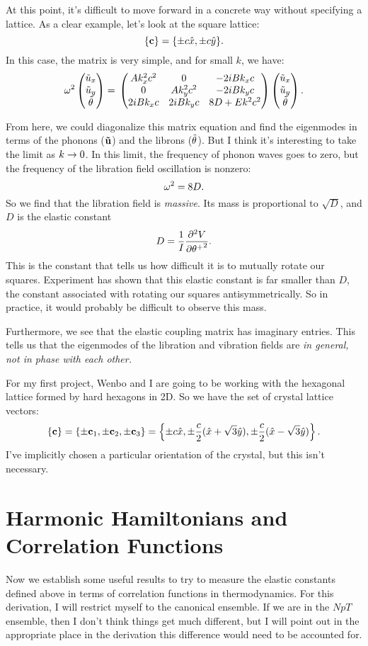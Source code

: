 \documentclass[12pt]{article}
\begin{document}
At this point, it's difficult to move forward in a concrete way without specifying a lattice. As a clear example, let's look at the square lattice:
\[ \{ \mathbf{c} \} = \{ \pm c \hat x, \pm c \hat y \}.\]
In this case, the matrix is very simple, and for small $k$, we have:
\[  \omega^2 \left(\begin{matrix} \tilde u_x \\ \tilde u_y \\ \tilde {\theta}\end{matrix}\right) = \\ \left(\begin{matrix} Ak_x^2c^2 & 0 & - 2i B k_x c \\ 0 & Ak_y^2 c^2 & -2iBk_y c \\ 2i B k_x c & 2i B k_y c & 8D + Ek^2c^2\end{matrix}\right) \left(\begin{matrix} \tilde u_x \\ \tilde u_y \\ \tilde {\theta}\end{matrix}\right).  \]

From here, we could diagonalize this matrix equation and find the eigenmodes in terms of the phonons ($\mathbf{\tilde u}$) and the librons ($\tilde {\theta}$). But I think it's interesting to take the limit as $k\rightarrow 0$. In this limit, the frequency of phonon waves goes to zero, but the frequency of the libration field oscillation is nonzero:
\[ \omega^2= 8D.\]
So we find that the libration field is \emph{massive}. Its mass is proportional to $\sqrt{D}$, and $D$ is the elastic constant
\[ D = \frac{1}{I}\frac{\partial^2 {V}}{\partial {\theta^+}^2}.\]
This is the constant that tells us how difficult it is to mutually rotate our squares. Experiment has shown that this elastic constant is far smaller than $D$, the constant associated with rotating our squares antisymmetrically. So in practice, it would probably be difficult to observe this mass.

Furthermore, we see that the elastic coupling matrix has imaginary entries. This tells us that the eigenmodes of the libration and vibration fields are \emph{in general, not in phase with each other.}

For my first project, Wenbo and I are going to be working with the hexagonal lattice formed by hard hexagons in 2D. So we have the set of crystal lattice vectors:
\[ \{ \mathbf{c} \} = \{\pm \mathbf{c}_1,\pm \mathbf{c}_2,\pm \mathbf{c}_3\} =    \left \{ \pm c \hat x, \pm \frac{c}{2} (\hat x + \sqrt 3 \hat y),\pm \frac{c}{2} (\hat x - \sqrt 3 \hat y) \right \}.\]
I've implicitly chosen a particular orientation of the crystal, but this isn't necessary.


\section{Harmonic Hamiltonians and Correlation Functions}
Now we establish some useful results to try to measure the elastic constants defined above in terms of correlation functions in thermodynamics. For this derivation, I will restrict myself to the canonical ensemble. If we are in the $NpT$ ensemble, then I don't think things get much different, but I will point out in the appropriate place in the derivation this difference would need to be accounted for.
\end{document}
